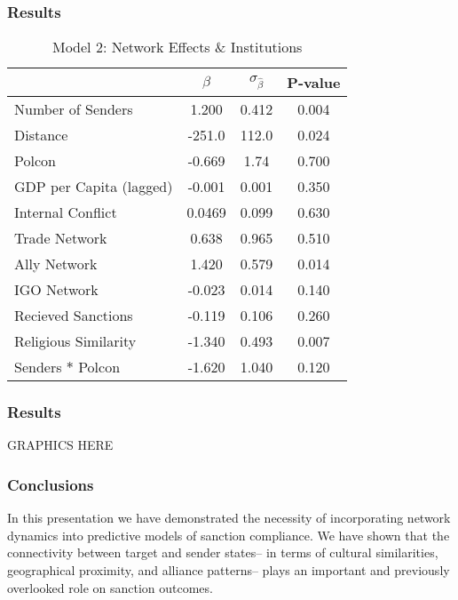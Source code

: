 \documentclass{beamer}
\begin{document}
\begin{frame}
\frametitle{Results}

\begin{table}
\caption{Model 2: Network Effects \& Institutions}
\begin{tabular}{lccc}
\hline
& $\beta$ & $\sigma_{\hat{\beta}}$ & P-value \\
\hline
Number of Senders &  1.200 & 0.412 & 0.004 \\ 
Distance & -251.0 & 112.0 & 0.024 \\
Polcon & -0.669 &  1.74 & 0.700 \\
GDP per Capita (lagged) & -0.001 &  0.001 &  0.350 \\
Internal Conflict & 0.0469 & 0.099 & 0.630 \\
Trade Network & 0.638 & 0.965 & 0.510 \\
Ally Network & 1.420 & 0.579 & 0.014 \\
IGO Network &  -0.023 & 0.014 & 0.140 \\
Recieved Sanctions & -0.119 & 0.106 & 0.260 \\
Religious Similarity &  -1.340 & 0.493  & 0.007 \\
Senders $*$ Polcon & -1.620 & 1.040 & 0.120 \\
\hline
\end{tabular}
\end{table}

\end{frame}

\begin{frame}
\frametitle{Results}
GRAPHICS HERE
\end{frame}

\begin{frame}
\frametitle{Conclusions}
In this presentation we have demonstrated the necessity of incorporating network dynamics into predictive models of sanction compliance. We have shown that the connectivity between target and sender states-- in terms of cultural similarities, geographical proximity, and alliance patterns-- plays an important and previously overlooked role on sanction outcomes. 
\end{frame}
\end{document}
